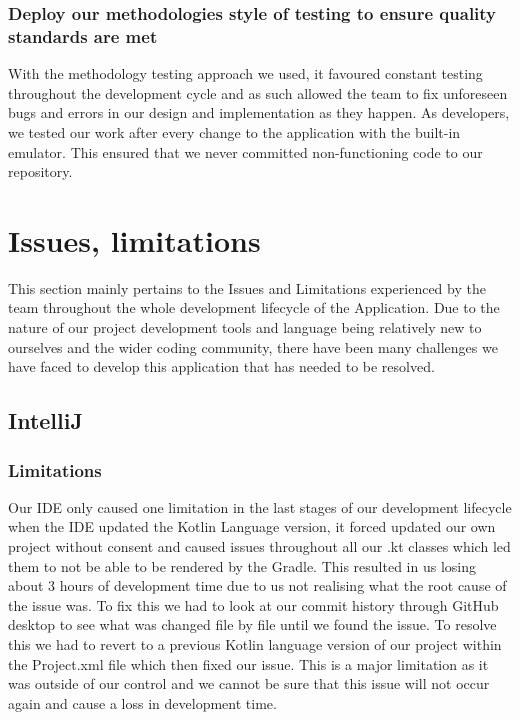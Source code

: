 \subsubsection {Deploy our methodologies style of testing to ensure quality standards are met}
With the methodology testing approach we used, it favoured constant testing throughout the development cycle and as such allowed the team to fix unforeseen bugs and errors in our design and implementation as they happen. As developers, we tested our work after every change to the application with the built-in emulator. This ensured that we never committed non-functioning code to our repository.
\newpage
\section{Issues, limitations}
This section mainly pertains to the Issues and Limitations experienced by the team throughout the whole development lifecycle of the Application. Due to the nature of our project development tools and language being relatively new to ourselves and the wider coding community, there have been many challenges we have faced to develop this application that has needed to be resolved.
\subsection{IntelliJ}
\subsubsection{Limitations}
Our IDE only caused one limitation in the last stages of our development lifecycle when the IDE updated the Kotlin Language version, it forced updated our own project without consent and caused issues throughout all our .kt classes which led them to not be able to be rendered by the Gradle.
\newline
\newline
This resulted in us losing about 3 hours of development time due to us not realising what the root cause of the issue was. To fix this we had to look at our commit history through GitHub desktop to see what was changed file by file until we found the issue.
\newline
\newline
To resolve this we had to revert to a previous Kotlin language version of our project within the Project.xml file which then fixed our issue. This is a major limitation as it was outside of our control and we cannot be sure that this issue will not occur again and cause a loss in development time.

